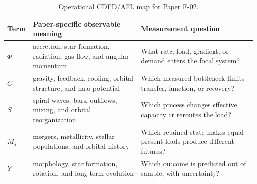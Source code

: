 \documentclass[11pt,a4paper]{article}
\begin{document}
\begin{table}[htbp]
\centering
\small
\caption{Operational CDFD/AFL map for Paper F-02.}
\begin{tabularx}{\textwidth}{|l|X|X|}
\hline
\textbf{Term} & \textbf{Paper-specific observable meaning} & \textbf{Measurement question} \\
\hline
$\Phi$ & accretion, star formation, radiation, gas flow, and angular momentum & What rate, load, gradient, or demand enters the focal system? \\
\hline
$C$ & gravity, feedback, cooling, orbital structure, and halo potential & Which measured bottleneck limits transfer, function, or recovery? \\
\hline
$S$ & spiral waves, bars, outflows, mixing, and orbital reorganization & Which process changes effective capacity or reroutes the load? \\
\hline
$M_s$ & mergers, metallicity, stellar populations, and orbital history & Which retained state makes equal present loads produce different futures? \\
\hline
$Y$ & morphology, star formation, rotation, and long-term evolution & Which outcome is predicted out of sample, with uncertainty? \\
\hline
\end{tabularx}
\end{table}
\end{document}
